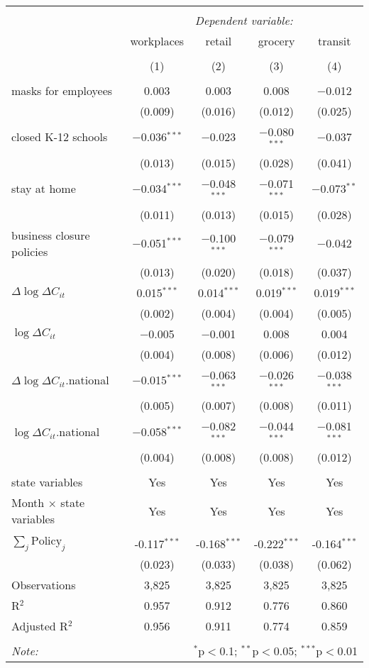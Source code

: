 \begin{tabular}{@{\extracolsep{1pt}}lcccc} 
\\[-1.8ex]\hline 
\hline \\[-1.8ex] 
 & \multicolumn{4}{c}{\textit{Dependent variable:}} \\ 
\cline{2-5} 
 & workplaces & retail & grocery & transit \\ 
\\[-1.8ex] & (1) & (2) & (3) & (4)\\ 
\hline \\[-1.8ex] 
 masks for employees & 0.003 & 0.003 & 0.008 & $-$0.012 \\ 
  & (0.009) & (0.016) & (0.012) & (0.025) \\ 
  closed K-12 schools & $-$0.036$^{***}$ & $-$0.023 & $-$0.080$^{***}$ & $-$0.037 \\ 
  & (0.013) & (0.015) & (0.028) & (0.041) \\ 
  stay at home & $-$0.034$^{***}$ & $-$0.048$^{***}$ & $-$0.071$^{***}$ & $-$0.073$^{**}$ \\ 
  & (0.011) & (0.013) & (0.015) & (0.028) \\ 
  business closure policies & $-$0.051$^{***}$ & $-$0.100$^{***}$ & $-$0.079$^{***}$ & $-$0.042 \\ 
  & (0.013) & (0.020) & (0.018) & (0.037) \\ 
  $\Delta \log \Delta C_{it}$ & 0.015$^{***}$ & 0.014$^{***}$ & 0.019$^{***}$ & 0.019$^{***}$ \\ 
  & (0.002) & (0.004) & (0.004) & (0.005) \\ 
  $\log \Delta C_{it}$ & $-$0.005 & $-$0.001 & 0.008 & 0.004 \\ 
  & (0.004) & (0.008) & (0.006) & (0.012) \\ 
  $\Delta \log \Delta C_{it}$.national & $-$0.015$^{***}$ & $-$0.063$^{***}$ & $-$0.026$^{***}$ & $-$0.038$^{***}$ \\ 
  & (0.005) & (0.007) & (0.008) & (0.011) \\ 
  $\log \Delta C_{it}$.national & $-$0.058$^{***}$ & $-$0.082$^{***}$ & $-$0.044$^{***}$ & $-$0.081$^{***}$ \\ 
  & (0.004) & (0.008) & (0.008) & (0.012) \\ 
 \hline \\[-1.8ex] 
state variables & Yes & Yes & Yes & Yes \\ 
Month $\times$ state variables & Yes & Yes & Yes & Yes \\ 
\hline \\[-1.8ex] 
$\sum_j \mathrm{Policy}_j$ & -0.117$^{***}$ & -0.168$^{***}$ & -0.222$^{***}$ & -0.164$^{***}$ \\ 
 & (0.023) & (0.033) & (0.038) & (0.062) \\ 
Observations & 3,825 & 3,825 & 3,825 & 3,825 \\ 
R$^{2}$ & 0.957 & 0.912 & 0.776 & 0.860 \\ 
Adjusted R$^{2}$ & 0.956 & 0.911 & 0.774 & 0.859 \\ 
\hline 
\hline \\[-1.8ex] 
\textit{Note:}  & \multicolumn{4}{r}{$^{*}$p$<$0.1; $^{**}$p$<$0.05; $^{***}$p$<$0.01} \\ 
\end{tabular} 